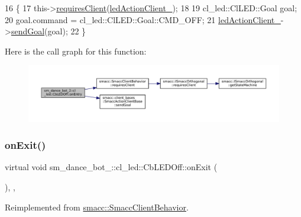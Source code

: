 \begin{DoxyCode}
16   \{
17     this->\hyperlink{classsmacc_1_1SmaccClientBehavior_a917f001e763a1059af337bf4e164f542}{requiresClient}(\hyperlink{classsm__dance__bot__2_1_1cl__led_1_1CbLEDOff_a569146280ebdd71aa5b8f3268eb028bc}{ledActionClient\_});
18 
19     cl\_led::ClLED::Goal goal;
20     goal.command = cl\_led::ClLED::Goal::CMD\_OFF;
21     \hyperlink{classsm__dance__bot__2_1_1cl__led_1_1CbLEDOff_a569146280ebdd71aa5b8f3268eb028bc}{ledActionClient\_}->\hyperlink{classsmacc_1_1client__bases_1_1SmaccActionClientBase_a9c47a5094ac8afb01680307fe5eca922}{sendGoal}(goal);
22   \}
\end{DoxyCode}
Here is the call graph for this function\+:
\nopagebreak
\begin{figure}[H]
\begin{center}
\leavevmode
\includegraphics[width=350pt]{classsm__dance__bot__2_1_1cl__led_1_1CbLEDOff_a101b78da1cfd4dcbec6fc607c956bd14_cgraph}
\end{center}
\end{figure}
\mbox{\label{classsm__dance__bot__2_1_1cl__led_1_1CbLEDOff_a6ca7b3ba30347c4be33d3b4946009325}} 
\subsubsection{\texorpdfstring{on\+Exit()}{onExit()}}
{\footnotesize\ttfamily virtual void sm\+\_\+dance\+\_\+bot\+\_\+::cl\+\_\+led\+::\+Cb\+L\+E\+D\+Off\+::on\+Exit (\begin{DoxyParamCaption}{ }\end{DoxyParamCaption})\hspace{0.3cm}{\ttfamily [inline]}, {\ttfamily [override]}, {\ttfamily [virtual]}}



Reimplemented from \hyperlink{classsmacc_1_1SmaccClientBehavior_ac0cd72d42bd00425362a97c9803ecce5}{smacc\+::\+Smacc\+Client\+Behavior}.




